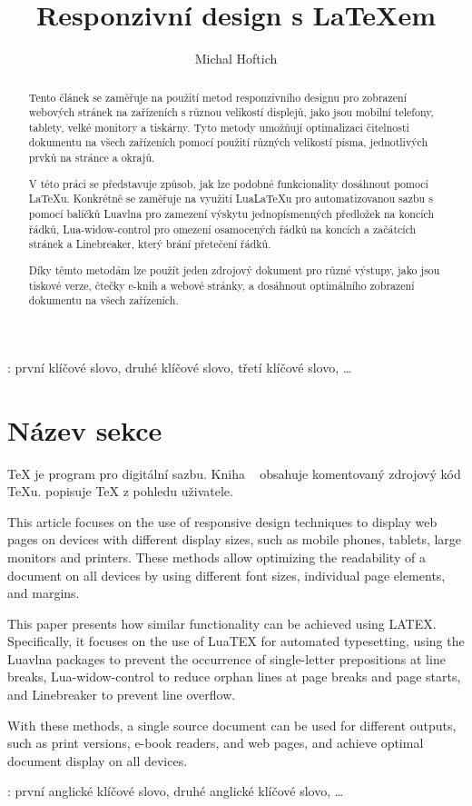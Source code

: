 \documentclass{csbulletin}
\begin{document}
\title{Responzivní design s \LaTeX em}
\author{Michal Hoftich}
\maketitle

\begin{abstract}
Tento článek se zaměřuje na použití metod responzivního designu pro zobrazení
webových stránek na zařízeních s různou velikostí displejů, jako jsou mobilní
telefony, tablety, velké monitory a tiskárny. Tyto metody umožňují optimalizaci
čitelnosti dokumentu na všech zařízeních pomocí použití různých velikostí
písma, jednotlivých prvků na stránce a okrajů.

V této práci se představuje způsob, jak lze podobné funkcionality dosáhnout
pomocí \LaTeX u. Konkrétně se zaměřuje na využití Lua\LaTeX u pro automatizovanou
sazbu s pomocí balíčků Luavlna pro zamezení výskytu jednopísmenných předložek
na koncích řádků, Lua-widow-control pro omezení osamocených řádků na koncích a
začátcích stránek a Linebreaker, který brání přetečení řádků.

Díky těmto metodám lze použít jeden zdrojový dokument pro různé výstupy, jako
jsou tiskové verze, čtečky e-knih a webové stránky, a dosáhnout optimálního
zobrazení dokumentu na všech zařízeních.
\end{abstract}
\klicovaslova: první klíčové slovo, druhé klíčové slovo, třetí klíčové slovo, …

\section{Název sekce}
\TeX{} je program pro digitální sazbu. Kniha ~\cite{knuth-ttp} obsahuje komentovaný zdrojový kód \TeX u. \textcite{knuth-tb} popisuje \TeX{} z pohledu uživatele.

\printbibliography

\begin{summary}
  This article focuses on the use of responsive design techniques to display web pages on devices with different display sizes, such as mobile phones, tablets, large monitors and printers. These methods allow optimizing the readability of a document on all devices by using different font sizes, individual page elements, and margins.

  This paper presents how similar functionality can be achieved using LATEX. Specifically, it focuses on the use of LuaTEX for automated typesetting, using the Luavlna packages to prevent the occurrence of single-letter prepositions at line breaks, Lua-widow-control to reduce orphan lines at page breaks and page starts, and Linebreaker to prevent line overflow.

  With these methods, a single source document can be used for different outputs, such as print versions, e-book readers, and web pages, and achieve optimal document display on all devices.

\keywords: první anglické klíčové slovo, druhé anglické klíčové slovo, …
\end{summary}
\end{document}
